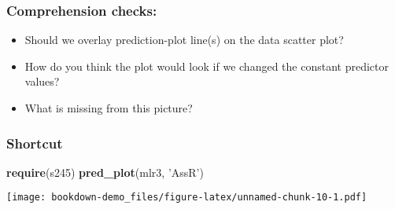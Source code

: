 \documentclass[]{book}
\newenvironment{Shaded}{\begin{snugshade}}{\end{snugshade}}
\newcommand{\KeywordTok}[1]{\textcolor[rgb]{0.13,0.29,0.53}{\textbf{#1}}}
\newcommand{\NormalTok}[1]{#1}
\newcommand{\StringTok}[1]{\textcolor[rgb]{0.31,0.60,0.02}{#1}}
\providecommand{\tightlist}{%
  \setlength{\itemsep}{0pt}\setlength{\parskip}{0pt}}
\begin{document}
\hypertarget{comprehension-checks}{%
\subsubsection{Comprehension checks:}\label{comprehension-checks}}

\begin{itemize}
\tightlist
\item
  Should we overlay prediction-plot line(s) on the data scatter plot?
\item
  How do you think the plot would look if we changed the constant predictor values?
\item
  What is missing from this picture?
\end{itemize}

\hypertarget{shortcut}{%
\subsubsection{Shortcut}\label{shortcut}}

\begin{Shaded}
\begin{Highlighting}[]
\KeywordTok{require}\NormalTok{(s245)}
\KeywordTok{pred_plot}\NormalTok{(mlr3, }\StringTok{'AssR'}\NormalTok{)}
\end{Highlighting}
\end{Shaded}

\texttt{[image: bookdown-demo\_files/figure-latex/unnamed-chunk-10-1.pdf]}


\end{document}
